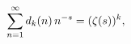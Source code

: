 \[\sum_{n=1}^{\infty}\mathop{d_{k}\/}\nolimits\!\left(n\right)n^{-s}=(\mathop{%
\zeta\/}\nolimits\!\left(s\right))^{k},\]